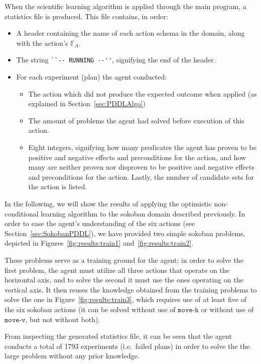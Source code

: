 \documentclass[../Master.tex]{subfiles}
\begin{document}
When the scientific learning algorithm is applied through the main program, a statistics file is produced. This file contains, in order:
\begin{itemize}
    \item A header containing the name of each action schema in the domain, along with the action's $\mathbb{F}_A$.
    \item The string \verb|``-- RUNNING --''|, signifying the end of the header.
    \item For each experiment (plan) the agent conducted:
        \begin{itemize}
            \item The action which did not produce the expected outcome when applied (as explained in Section~\ref{sec:PDDLAlgo})
            \item The amount of problems the agent had solved before execution of this action.
            \item Eight integers, signifying how many predicates the agent has proven to be positive and negative effects and preconditions for the action, and how many are neither proven nor disproven to be positive and negative effects and preconditions for the action. Lastly, the number of candidate sets for the action is listed.
        \end{itemize}
\end{itemize}

In the following, we will show the results of applying the optimistic non-conditional learning algorithm to the sokoban domain described previously. In order to ease the agent's understanding of the  six actions (see Section~\ref{sec:SokobanPDDL}), we have provided two simple sokoban problems, depicted in Figures~\ref{fig:results:train1} and~\ref{fig:results:train2}. 

These problems serve as a training ground for the agent; in order to solve the first problem, the agent must utilize all three actions that operate on the horizontal axis, and to solve the second it must use the ones operating on the vertical axis. It then reuses the knowledge obtained from the training problems to solve the one in Figure~\ref{fig:results:train3}, which requires use of at least five of the six sokoban actions (it can be solved without use of $\texttt{move-h}$ or without use of $\texttt{move-v}$, but not without both).

From inspecting the generated statistics file, it can be seen that the agent conducts a total of 1793 experiments (i.e.\ failed plans) in order to solve the the large problem without any prior knowledge.
\end{document}

